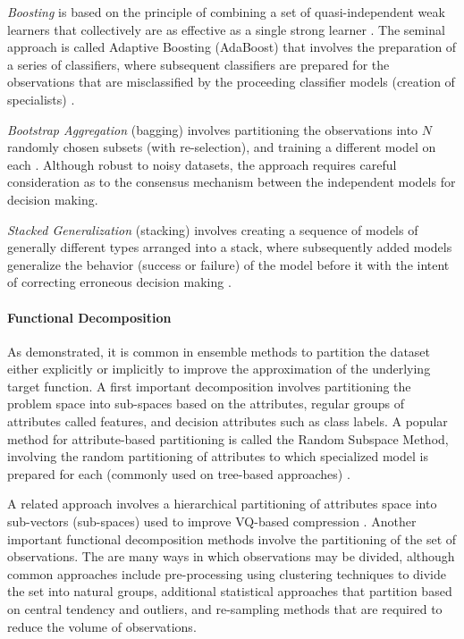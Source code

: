 \emph{Boosting} is based on the principle of combining a set of quasi-independent weak learners that collectively are as effective as a single strong learner \cite{Kearns1988, Schapire1992}. The seminal approach is called Adaptive Boosting (AdaBoost) that involves the preparation of a series of classifiers, where subsequent classifiers are prepared for the observations that are misclassified by the proceeding classifier models (creation of specialists) \cite{Schapire2003}. 

\emph{Bootstrap Aggregation} (bagging) involves partitioning the observations into $N$ randomly chosen subsets (with re-selection), and training a different model on each \cite{Breiman1996}. Although robust to noisy datasets, the approach requires careful consideration as to the consensus mechanism between the independent models for decision making. 

\emph{Stacked Generalization} (stacking) involves creating a sequence of models of generally different types arranged into a stack, where subsequently added models generalize the behavior (success or failure) of the model before it with the intent of correcting erroneous decision making \cite{Wolpert1992, Ting1999}. 
	
\paragraph{Functional Decomposition}
As demonstrated, it is common in ensemble methods to partition the dataset either explicitly or implicitly to improve the approximation of the underlying target function. A first important decomposition involves partitioning the problem space into sub-spaces based on the attributes, regular groups of attributes called features, and decision attributes such as class labels. A popular method for attribute-based partitioning is called the Random Subspace Method, involving the random partitioning of attributes to which specialized model is prepared for each (commonly used on tree-based approaches) \cite{Ho1998}. 

A related approach involves a hierarchical partitioning of attributes space into sub-vectors (sub-spaces) used to improve VQ-based compression \cite{Gersho1984}. Another important functional decomposition methods involve the partitioning of the set of observations. The are many ways in which observations may be divided, although common approaches include pre-processing using clustering techniques to divide the set into natural groups, additional statistical approaches that partition based on central tendency and outliers, and re-sampling methods that are required to reduce the volume of observations.
	
